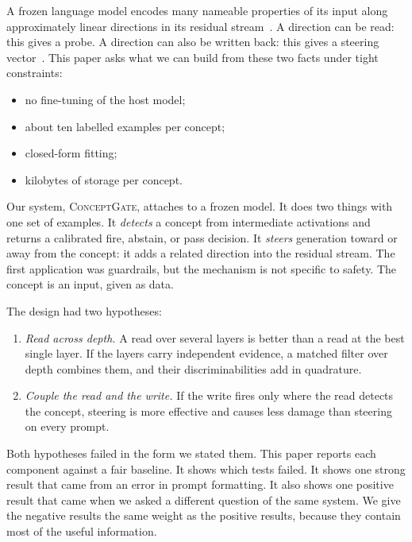 \documentclass[11pt]{article}
\newcommand{\cg}{\textsc{ConceptGate}}
\begin{document}
A frozen language model encodes many nameable properties of its input along approximately linear
directions in its residual stream~\citep{alain2016probes,zou2023repe,park2023linear}. A direction can be
read: this gives a probe. A direction can also be written back: this gives a steering
vector~\citep{turner2023actadd,panickssery2023caa}. This paper asks what we can build from these two facts
under tight constraints:
\begin{itemize}[leftmargin=*]
  \item no fine-tuning of the host model;
  \item about ten labelled examples per concept;
  \item closed-form fitting;
  \item kilobytes of storage per concept.
\end{itemize}

Our system, \cg{}, attaches to a frozen model. It does two things with one set of examples. It
\emph{detects} a concept from intermediate activations and returns a calibrated fire, abstain, or pass
decision. It \emph{steers} generation toward or away from the concept: it adds a related direction into
the residual stream. The first application was guardrails, but the mechanism is not specific to safety.
The concept is an input, given as data.

The design had two hypotheses:
\begin{enumerate}[leftmargin=*]
  \item \emph{Read across depth.} A read over several layers is better than a read at the best single
    layer. If the layers carry independent evidence, a matched filter over depth combines them, and their
    discriminabilities add in quadrature.
  \item \emph{Couple the read and the write.} If the write fires only where the read detects the concept,
    steering is more effective and causes less damage than steering on every prompt.
\end{enumerate}

Both hypotheses failed in the form we stated them. This paper reports each component against a fair
baseline. It shows which tests failed. It shows one strong result that came from an error in prompt
formatting. It also shows one positive result that came when we asked a different question of the same
system. We give the negative results the same weight as the positive results, because they contain most of
the useful information.
\end{document}
